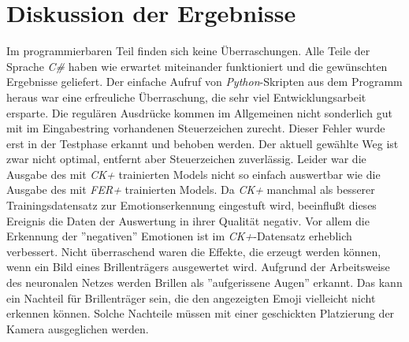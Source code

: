\documentclass[10pt,a4paper]{report}
\begin{document}
\section{Diskussion der Ergebnisse}
Im programmierbaren Teil finden sich keine \"{U}berraschungen. Alle Teile der Sprache \textit{C\#} haben wie erwartet miteinander funktioniert und die gew\"{u}nschten Ergebnisse geliefert. Der einfache Aufruf von \textit{Python}-Skripten aus dem Programm heraus war eine erfreuliche \"{U}berraschung, die sehr viel Entwicklungsarbeit ersparte. Die regul\"{a}ren Ausdr\"{u}cke kommen im Allgemeinen nicht sonderlich gut mit im Eingabestring vorhandenen Steuerzeichen zurecht. Dieser Fehler wurde erst in der Testphase erkannt und behoben werden. Der aktuell gew\"{a}hlte Weg ist zwar nicht optimal, entfernt aber Steuerzeichen zuverl\"{a}ssig. Leider war die Ausgabe des mit \textit{CK+} trainierten Models nicht so einfach auswertbar wie die Ausgabe des mit \textit{FER+} trainierten Models. Da \textit{CK+} manchmal als besserer Trainingsdatensatz zur Emotionserkennung eingestuft wird, beeinflu{\ss}t dieses Ereignis die Daten der Auswertung in ihrer Qualit\"{a}t negativ. Vor allem die Erkennung der ''negativen'' Emotionen ist im \textit{CK+}-Datensatz erheblich verbessert.  Nicht \"{u}berraschend waren die Effekte, die erzeugt werden k\"{o}nnen, wenn ein Bild eines Brillentr\"{a}gers ausgewertet wird. Aufgrund der Arbeitsweise des neuronalen Netzes werden Brillen als ''aufgerissene Augen'' erkannt. Das kann ein Nachteil f\"{u}r Brillentr\"{a}ger sein, die den angezeigten Emoji vielleicht nicht erkennen k\"{o}nnen. Solche Nachteile m\"{u}ssen mit einer geschickten Platzierung der Kamera ausgeglichen werden.
\end{document}
